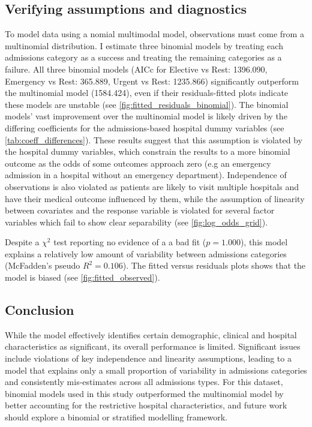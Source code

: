 \documentclass[11pt]{article}
\begin{document}
\subsection*{
    \vspace{-0.25cm}
    Verifying assumptions and diagnostics
}
 To model data using a nomial multimodal model, observations must come from a multinomial distribution. I estimate three binomial models by treating each admissions category as a success and treating the remaining categories as a failure. All three binomial models (AICc for Elective vs Rest: 1396.090, Emergency vs Rest: 365.889, Urgent vs Rest: 1235.866) significantly outperform the multinomial model (1584.424), even if their residuals-fitted plots indicate these models are unstable (see \ref{fig:fitted_residuals_binomial}). The binomial models' vast improvement over the multinomial model is likely driven by the differing coefficients for the admissions-based hospital dummy variables (see \ref{tab:coeff_differences}). These results suggest that this assumption is violated by the hospital dummy variables, which constrain the results to a more binomial outcome as the odds of some outcomes approach zero (e.g an emergency admission in a hospital without an emergency department). Independence of observations is also violated as patients are likely to visit multiple hospitals and have their medical outcome influenced by them, while the assumption of linearity between covariates and the response variable is violated for several factor variables which fail to show clear separability (see \ref{fig:log_odds_grid}).

Despite a $\chi^2$ test reporting no evidence of a a bad fit ($p = 1.000$), this model explains a relatively low amount of variability between admissions categories (McFadden's pseudo $R^2 = 0.106$). The fitted versus residuals plots shows that the model is biased (see \ref{fig:fitted_observed}). 


 \vspace{-0.5cm}
\subsection*{
    \vspace{-0.25cm}
    Conclusion
}

While the model effectively identifies certain demographic, clinical and hospital characteristics as significant, its overall performance is limited. Significant issues include violations of key independence and linearity assumptions, leading to a model that explains only a small proportion of variability in admissions categories and consistently mis-estimates across all admissions types. For this dataset, binomial models used in this study outperformed the multinomial model by better accounting for the restrictive hospital characteristics, and future work should explore a binomial or stratified modelling framework.
\end{document}
